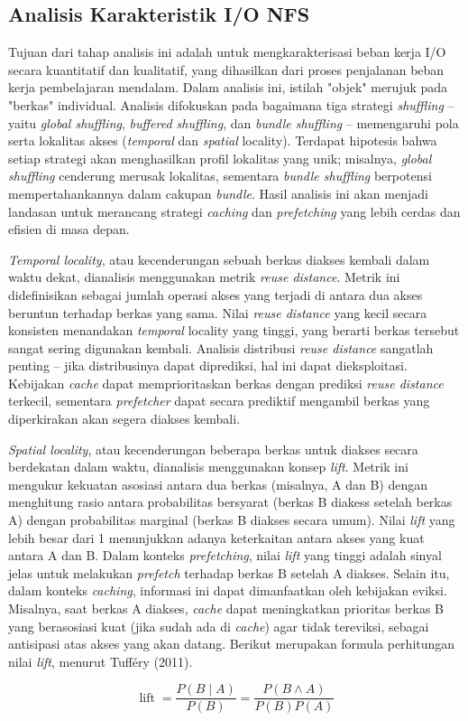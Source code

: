 \subsection{Analisis Karakteristik I/O NFS}
\label{sec:metopenkarakteristik}

Tujuan dari tahap analisis ini adalah untuk mengkarakterisasi beban kerja I/O secara kuantitatif dan kualitatif, yang dihasilkan dari proses penjalanan beban kerja pembelajaran mendalam. Dalam analisis ini, istilah "objek" merujuk pada "berkas" individual. Analisis difokuskan pada bagaimana tiga strategi \textit{shuffling} -- yaitu \textit{global shuffling}, \textit{buffered shuffling}, dan \textit{bundle shuffling} -- memengaruhi pola serta lokalitas akses (\textit{temporal} dan \textit{spatial} locality). Terdapat hipotesis bahwa setiap strategi akan menghasilkan profil lokalitas yang unik; misalnya, \textit{global shuffling} cenderung merusak lokalitas, sementara \textit{bundle shuffling} berpotensi mempertahankannya dalam cakupan \textit{bundle}. Hasil analisis ini akan menjadi landasan untuk merancang strategi \textit{caching} dan \textit{prefetching} yang lebih cerdas dan efisien di masa depan.

\textit{Temporal locality}, atau kecenderungan sebuah berkas diakses kembali dalam waktu dekat, dianalisis menggunakan metrik \textit{reuse distance}. Metrik ini didefinisikan sebagai jumlah operasi akses yang terjadi di antara dua akses beruntun terhadap berkas yang sama. Nilai \textit{reuse distance} yang kecil secara konsisten menandakan \textit{temporal} locality yang tinggi, yang berarti berkas tersebut sangat sering digunakan kembali. Analisis distribusi \textit{reuse distance} sangatlah penting -- jika distribusinya dapat diprediksi, hal ini dapat dieksploitasi. Kebijakan \textit{cache} dapat memprioritaskan berkas dengan prediksi \textit{reuse distance} terkecil, sementara \textit{prefetcher} dapat secara prediktif mengambil berkas yang diperkirakan akan segera diakses kembali.

\textit{Spatial locality}, atau kecenderungan beberapa berkas untuk diakses secara berdekatan dalam waktu, dianalisis menggunakan konsep \textit{lift}. Metrik ini mengukur kekuatan asosiasi antara dua berkas (misalnya, A dan B) dengan menghitung rasio antara probabilitas bersyarat (berkas B diakess setelah berkas A) dengan probabilitas marginal (berkas B diakses secara umum). Nilai \textit{lift} yang lebih besar dari 1 menunjukkan adanya keterkaitan antara akses yang kuat antara A dan B. Dalam konteks \textit{prefetching}, nilai \textit{lift} yang tinggi adalah sinyal jelas untuk melakukan \textit{prefetch} terhadap berkas B setelah A diakses. Selain itu, dalam konteks \textit{caching}, informasi ini dapat dimanfaatkan oleh kebijakan eviksi. Misalnya, saat berkas A diakses, \textit{cache} dapat meningkatkan prioritas berkas B yang berasosiasi kuat (jika sudah ada di \textit{cache}) agar tidak tereviksi, sebagai antisipasi atas akses yang akan datang. Berikut merupakan formula perhitungan nilai \textit{lift}, menurut Tufféry (2011).

\[
\operatorname{lift} = \frac{P(B \mid A)}{P(B)} = \frac{P(B \wedge A)}{P(B) P(A)}
\]
